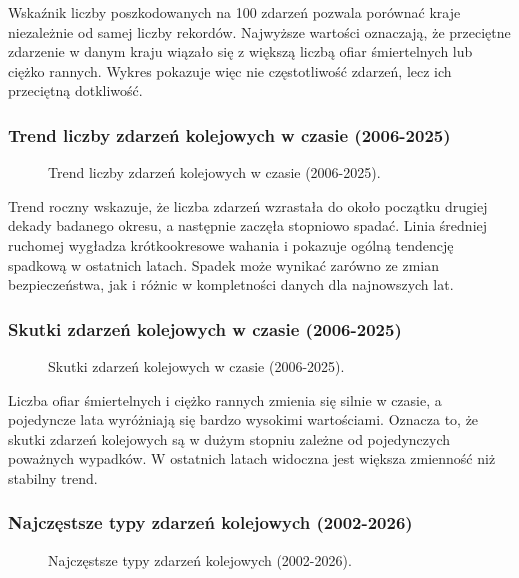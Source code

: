 \documentclass[12pt]{article}
\begin{document}
Wskaźnik liczby poszkodowanych na 100 zdarzeń pozwala porównać kraje niezależnie od samej liczby rekordów. Najwyższe wartości oznaczają, że przeciętne zdarzenie w danym kraju wiązało się z większą liczbą ofiar śmiertelnych lub ciężko rannych. Wykres pokazuje więc nie częstotliwość zdarzeń, lecz ich przeciętną dotkliwość.

\subsubsection{Trend liczby zdarzeń kolejowych w czasie (2006-2025)}
\begin{figure}[H]
    \centering
    
    \caption{Trend liczby zdarzeń kolejowych w czasie (2006-2025).}
\end{figure}


Trend roczny wskazuje, że liczba zdarzeń wzrastała do około początku drugiej dekady badanego okresu, a następnie zaczęła stopniowo spadać. Linia średniej ruchomej wygładza krótkookresowe wahania i pokazuje ogólną tendencję spadkową w ostatnich latach. Spadek może wynikać zarówno ze zmian bezpieczeństwa, jak i różnic w kompletności danych dla najnowszych lat.

\subsubsection{Skutki zdarzeń kolejowych w czasie (2006-2025)}
\begin{figure}[H]
    \centering
    
    \caption{Skutki zdarzeń kolejowych w czasie (2006-2025).}
\end{figure}


Liczba ofiar śmiertelnych i ciężko rannych zmienia się silnie w czasie, a pojedyncze lata wyróżniają się bardzo wysokimi wartościami. Oznacza to, że skutki zdarzeń kolejowych są w dużym stopniu zależne od pojedynczych poważnych wypadków. W ostatnich latach widoczna jest większa zmienność niż stabilny trend.

\subsubsection{Najczęstsze typy zdarzeń kolejowych (2002-2026)}
\begin{figure}[H]
    \centering
    
    \caption{Najczęstsze typy zdarzeń kolejowych (2002-2026).}
\end{figure}
\end{document}

